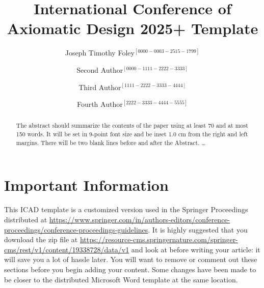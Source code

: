\documentclass{svproc}
\begin{document}
\title{International Conference of Axiomatic Design 2025+ Template}


\newcommand{\orcid}[1]{\ensuremath{^{[#1]}}}

\author{Joseph Timothy Foley\orcid{0000-0003-2515-1799}
  \and Second Author\orcid{0000-1111-2222-3333}
  \and Third Author\orcid{1111-2222-3333-4444}
  \and Fourth Author\orcid{2222-3333-4444-5555}}


\maketitle              %

\begin{abstract}
The abstract should summarize the contents of the paper
using at least 70 and at most 150 words. It will be set in 9-point
font size and be inset 1.0 cm from the right and left margins.
There will be two blank lines before and after the Abstract. \dots
\end{abstract}

\section*{Important Information}\label{sec:important-info}
This ICAD template is a customized version used in the Springer Proceedings distributed at \url{https://www.springer.com/in/authors-editors/conference-proceedings/conference-proceedings-guidelines}.
It is highly suggested that you download the zip file at \url{https://resource-cms.springernature.com/springer-cms/rest/v1/content/19338728/data/v1} and look at  before writing your article:  it will save you a lot of hassle later.
You will want to remove or comment out these sections before you begin adding your content.
Some changes have been made to be closer to the distributed Microsoft Word template at the same location.
\end{document}
